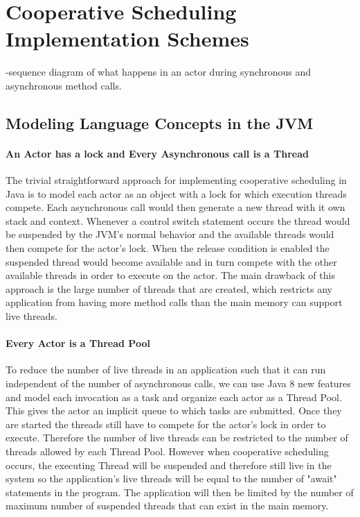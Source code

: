 \section{Cooperative Scheduling Implementation Schemes}

-sequence diagram of what happens in an actor during synchronous and asynchronous method calls.

\subsection{Modeling Language Concepts in the JVM}
\paragraph{An Actor has a lock and Every Asynchronous call is a Thread}
The trivial straightforward approach for implementing cooperative scheduling in Java is to model each actor as an object with a lock for which execution threads compete. Each asynchronous call would then generate a new thread with it own stack and context. Whenever a control switch statement occurs the thread would be suspended by the JVM's normal behavior and the available threads would then compete for the actor's lock. When the release condition is enabled the suspended thread would become available and in turn compete with the other available threads in order to execute on the actor. The main drawback of this approach is the large number of threads that are created, which restricts any application from having more method calls than the main memory can support live threads.

\paragraph{Every Actor is a Thread Pool}
To reduce the number of live threads in an application such that it can run independent of the number of asynchronous calls, we can use Java 8 new features and model each invocation as a task and organize each actor as a Thread Pool. This gives the actor an implicit queue to which tasks are submitted. Once they are started the threads still have to compete for the actor's lock in order to execute. Therefore the number of live threads can be restricted to the number of threads allowed by each Thread Pool. However when cooperative scheduling occurs, the executing Thread will be suspended and therefore still live in the system so the application's live threads will be equal to the number of "await" statements in the program. The application will then be limited by the number of maximum number of suspended threads that can exist in the main memory.  

